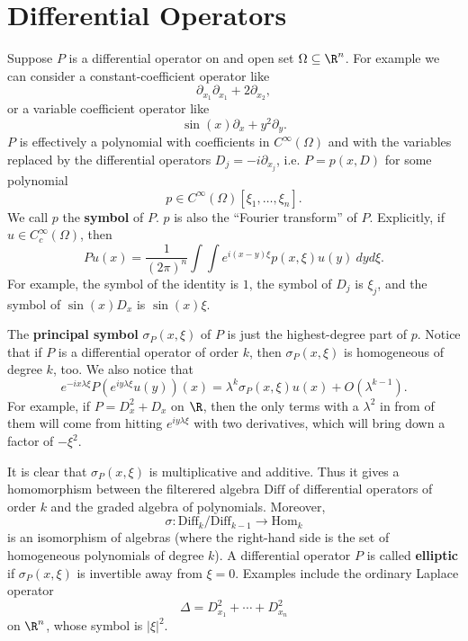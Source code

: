 \documentclass[12pt]{article}
\begin{document}
\section{Differential Operators}
Suppose $P$ is a differential operator on and open set $\Omega \subseteq \R^n$. For example we can consider a constant-coefficient operator like
\[\partial_{x_1}\partial_{x_1} +2 \partial_{x_2},\] or a variable coefficient operator like
\[\sin(x)\partial_x + y^2\partial_y.\] $P$ is effectively a polynomial with coefficients in $C^\infty(\Omega)$ and with the variables replaced by the differential operators $D_j= -i\partial_{x_j}$, i.e. $P = p(x,D)$ for some polynomial
\[p \in C^\infty(\Omega)[\xi_1,\ldots,\xi_n].\] We call $p$ the \textbf{symbol} of $P$. $p$ is also the ``Fourier transform'' of $P$. Explicitly, if $u \in C_c^\infty(\Omega)$, then
\begin{equation}\label{quant}Pu(x) = \frac{1}{(2\pi)^n}\int\int e^{i(x-y)\xi}p(x,\xi)u(y)\ dyd\xi.\end{equation}
For example, the symbol of the identity is $1$, the symbol of $D_j$ is $\xi_j$, and the symbol of $\sin(x)D_x$ is $\sin(x)\xi$.

The \textbf{principal symbol} $\sigma_P(x,\xi)$ of $P$ is just the highest-degree part of $p$. Notice that if $P$ is a differential operator of order $k$, then $\sigma_P(x,\xi)$ is homogeneous of degree $k$, too. We also notice that
\begin{equation}\label{symb}e^{-ix\lambda \xi}P(e^{iy\lambda \xi} u(y))(x) = \lambda^k \sigma_P(x,\xi)u(x) + O(\lambda^{k-1}).\end{equation} For example, if $P = D_x^2 + D_x$ on $\R$, then the only terms with a $\lambda^2$ in from of them will come from hitting $e^{iy\lambda \xi}$ with two derivatives, which will bring down a factor of $-\xi^2$.

It is clear that $\sigma_P(x,\xi)$ is multiplicative and additive. Thus it gives a homomorphism between the filterered algebra $\text{Diff}$ of differential operators of order $k$ and the graded algebra of polynomials. Moreover,
\begin{equation}\label{factor}\sigma:\text{Diff}_k/\text{Diff}_{k-1} \to \text{Hom}_k\end{equation} is an isomorphism of algebras (where the right-hand side is the set of homogeneous polynomials of degree $k$). A differential operator $P$ is called \textbf{elliptic} if $\sigma_P(x,\xi)$ is invertible away from $\xi = 0$. Examples include the ordinary Laplace operator 
\[\Delta = D_{x_1}^2 + \cdots + D_{x_n}^2\] on $\R^n$, whose symbol is $|\xi|^2$.
\end{document}
